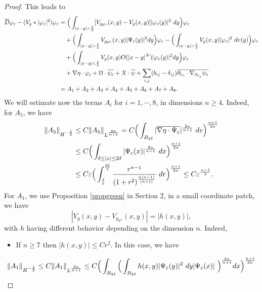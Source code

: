 \documentclass[11pt]{article}
\def \R {\mathbb{R}}
\begin{document}
{\begin{proof}
\noindent
This leads to 
\begin{align}
\overline{D}\varphi_{\varepsilon}-(V_{g}*|\varphi_{\varepsilon}|^{2})\varphi_{\varepsilon}&=\Big(\int_{|x-y|<\frac{\delta}{2}}[V_{g_{\R^{n}}}(x,y)-V_{g}(x,y)]|\varphi_{\varepsilon}(y)|^{2}\ dy \Big) \varphi_{\varepsilon}\notag\\
&\quad+\Big(\int_{|x-y|>\frac{\delta}{2}}V_{g_{\R^{n}}}(x,y)|\Psi_{\varepsilon}(y)|^{2} dy\Big) \varphi_{\varepsilon}-\Big(\int_{|x-y|>\frac{\delta}{2}}V_{g}(x,y)|\varphi_{\varepsilon}|^{2}\ dv(y) \Big) \varphi_{\varepsilon} \notag\\
&\quad+\Big(\int_{|x-y|<\frac{\delta}{2}}V_{g}(x,y)O(|x-y|^{N})|\varphi_{\varepsilon}(y)|^{2}dy\Big)\varphi_{\varepsilon}\notag\\
&\quad +\nabla \eta \cdot \varphi_{\varepsilon} + \Omega\cdot \overline{\psi_{\varepsilon}}+X\cdot \overline{\psi}+\sum_{i,j}(b_{ij}-\delta_{ij})\overline{\partial_{x_{i}}\cdot \nabla_{\partial_{x_{j}}}\psi_{\varepsilon}}\notag\\
&=A_{1}+A_{2}+A_{3}+A_{4}+A_{5}+A_{6}+A_{7}+A_{8}.\notag
\end{align}
We will estimate now the terms $A_{i}$ for $i=1,\cdots,8$, in dimensions $n\geq 4$. Indeed, for $A_{5}$, we have
\begin{align}
\|A_{5}\|_{H^{-\frac{1}{2}}}&\leq C\|A_{5}\|_{L^{\frac{2n}{n+1}}}=C\Big(\int_{B_{2\delta}}|\overline{\nabla \eta \cdot \Psi_{\varepsilon}}|^{\frac{2n}{n+1}}\ dv \Big)^{\frac{n+1}{2n}}\notag\\
&\leq C\Big(\int_{\delta\leq |x|\leq 2\delta}|\Psi_{\varepsilon}(x)|^{\frac{2n}{n+1}}\ dx \Big)^{\frac{n+1}{2n}}\notag\\
&\leq C \varepsilon \Big(\int_{\frac{\delta}{\varepsilon}}^{\frac{2\delta}{\varepsilon}}\frac{r^{n-1}}{(1+r^{2})^{\frac{n(n-1)}{(n+1)}}}\ dr \Big)^{\frac{n+1}{2n}}\leq C \varepsilon^{\frac{n-1}{2}}.\notag
\end{align}
For $A_{1}$, we use Proposition \ref{propgreen}  in Section 2, in a small coordinate patch, we have 
$$|V_{g}(x,y)-V_{g_{\R^{n}}}(x,y)|=|h(x,y)|,$$ 
with $h$ having different behavior depending on the dimension $n$. Indeed,
\begin{itemize}
\item If $n\geq 7$ then $|h(x,y)|\leq Cr^{2}$. In this case, we have
\end{itemize}
\begin{align}
\|A_{1}\|_{H^{-\frac{1}{2}}}&\leq C\|A_{1}\|_{L^{\frac{2n}{n+1}}}\leq C\Big(\int_{B_{2\delta}}\Big(\int_{B_{2\delta}}h(x,y)|\Psi_{\varepsilon}(y)|^{2}\ dy |\Psi_{\varepsilon}(x)|\ \Big)^{\frac{2n}{n+1}}dx\Big)^{\frac{n+1}{2n}}\notag\\

\end{align}
\end{proof}}
\end{document}
